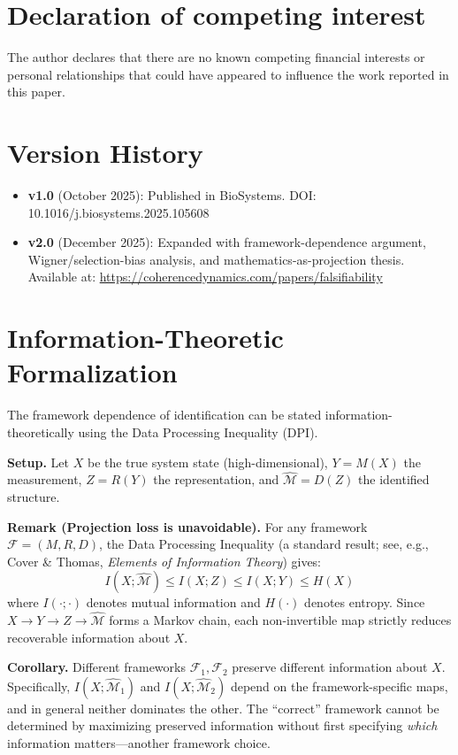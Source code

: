 \documentclass[12pt]{article}
\begin{document}
\section*{Declaration of competing interest}
The author declares that there are no known competing financial interests or personal relationships that could have appeared to influence the work reported in this paper.

\section*{Version History}
\begin{itemize}
\item \textbf{v1.0} (October 2025): Published in BioSystems. DOI: 10.1016/j.biosystems.2025.105608
\item \textbf{v2.0} (December 2025): Expanded with framework-dependence argument, Wigner/selection-bias analysis, and mathematics-as-projection thesis. Available at: \url{https://coherencedynamics.com/papers/falsifiability}
\end{itemize}

\appendix

\section{Information-Theoretic Formalization}
\label{appendix:info}

The framework dependence of identification can be stated information-theoretically using the Data Processing Inequality (DPI).

\textbf{Setup.} Let $X$ be the true system state (high-dimensional), $Y = M(X)$ the measurement, $Z = R(Y)$ the representation, and $\hat{\mathcal{M}} = D(Z)$ the identified structure.

\textbf{Remark (Projection loss is unavoidable).} For any framework $\mathcal{F} = (M, R, D)$, the Data Processing Inequality (a standard result; see, e.g., Cover \& Thomas, \textit{Elements of Information Theory}) gives:
\begin{equation}
I(X; \hat{\mathcal{M}}) \leq I(X; Z) \leq I(X; Y) \leq H(X)
\end{equation}
where $I(\cdot;\cdot)$ denotes mutual information and $H(\cdot)$ denotes entropy. Since $X \to Y \to Z \to \hat{\mathcal{M}}$ forms a Markov chain, each non-invertible map strictly reduces recoverable information about $X$.

\textbf{Corollary.} Different frameworks $\mathcal{F}_1, \mathcal{F}_2$ preserve different information about $X$. Specifically, $I(X; \hat{\mathcal{M}}_1)$ and $I(X; \hat{\mathcal{M}}_2)$ depend on the framework-specific maps, and in general neither dominates the other. The ``correct'' framework cannot be determined by maximizing preserved information without first specifying \emph{which} information matters---another framework choice.
\end{document}
